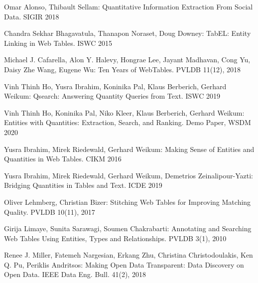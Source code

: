\documentclass[11pt]{article}
\begin{document}
\begin{thebibliography}{99} %


 Omar Alonso, Thibault Sellam:
Quantitative Information Extraction From Social Data. SIGIR 2018

 Chandra Sekhar Bhagavatula, Thanapon Noraset, Doug Downey:
TabEL: Entity Linking in Web Tables. ISWC 2015

 Michael J. Cafarella, Alon Y. Halevy, Hongrae Lee, Jayant Madhavan, Cong Yu, Daisy Zhe Wang, Eugene Wu:
Ten Years of WebTables. PVLDB 11(12), 2018

 Vinh Thinh Ho, Yusra Ibrahim, Koninika Pal, Klaus Berberich, Gerhard Weikum:
Qsearch: Answering Quantity Queries from Text. ISWC 2019

 Vinh Thinh Ho, Koninika Pal, Niko Kleer, Klaus Berberich, Gerhard Weikum:
Entities with Quantities: Extraction, Search, and Ranking.
Demo Paper, WSDM 2020

 	Yusra Ibrahim, Mirek Riedewald, Gerhard Weikum:
Making Sense of Entities and Quantities in Web Tables. CIKM 2016


 Yusra Ibrahim, Mirek Riedewald, Gerhard Weikum, Demetrios Zeinalipour-Yazti:
Bridging Quantities in Tables and Text. ICDE 2019

 Oliver Lehmberg, Christian Bizer:
Stitching Web Tables for Improving Matching Quality. PVLDB 10(11), 2017

 Girija Limaye, Sunita Sarawagi, Soumen Chakrabarti:
Annotating and Searching Web Tables Using Entities, Types and Relationships. PVLDB 3(1), 2010




 Renee J. Miller, Fatemeh Nargesian, Erkang Zhu, Christina Christodoulakis, Ken Q. Pu, Periklis Andritsos:
Making Open Data Transparent: Data Discovery on Open Data. IEEE Data Eng. Bull. 41(2), 2018




\end{thebibliography}
\end{document}
